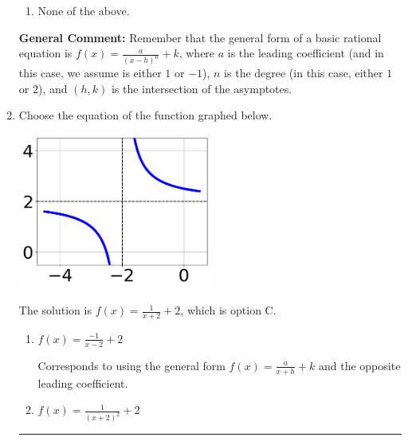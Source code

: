 \documentclass{extbook}[14pt]
\newcommand{\litem}[1]{\item #1

\rule{\textwidth}{0.4pt}}
\begin{document}
\begin{enumerate}
{\begin{enumerate}[label=\Alph*.]
\item None of the above.\end{enumerate}
\textbf{General Comment:} Remember that the general form of a basic rational equation is $ f(x) = \frac{a}{(x-h)^n} + k$, where $a$ is the leading coefficient (and in this case, we assume is either $1$ or $-1$), $n$ is the degree (in this case, either $1$ or $2$), and $(h, k)$ is the intersection of the asymptotes.
}
\litem{
Choose the equation of the function graphed below.

\begin{center}
    \includegraphics[width=0.5\textwidth]{../Figures/rationalGraphToEquationA.png}
\end{center}


The solution is \( f(x) = \frac{1}{x + 2} + 2 \), which is option C.\begin{enumerate}[label=\Alph*.]
\item \( f(x) = \frac{-1}{x - 2} + 2 \)

Corresponds to using the general form $f(x) = \frac{a}{x+h}+k$ and the opposite leading coefficient.
\item \( f(x) = \frac{1}{(x + 2)^2} + 2 \)


\end{enumerate}}
\end{enumerate}
\end{document}
